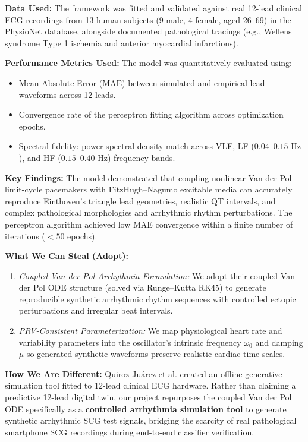 \textbf{Data Used:} The framework was fitted and validated against real 12-lead clinical ECG recordings from 13 human subjects (9 male, 4 female, aged 26--69) in the PhysioNet database, alongside documented pathological tracings (e.g., Wellens syndrome Type 1 ischemia and anterior myocardial infarctions).

\textbf{Performance Metrics Used:} The model was quantitatively evaluated using:
\begin{itemize}
    \item Mean Absolute Error ($\text{MAE}$) between simulated and empirical lead waveforms across 12 leads.
    \item Convergence rate of the perceptron fitting algorithm across optimization epochs.
    \item Spectral fidelity: power spectral density match across VLF, LF ($0.04\text{--}0.15\text{ Hz}$), and HF ($0.15\text{--}0.40\text{ Hz}$) frequency bands.
\end{itemize}

\textbf{Key Findings:} The model demonstrated that coupling nonlinear Van der Pol limit-cycle pacemakers with FitzHugh--Nagumo excitable media can accurately reproduce Einthoven's triangle lead geometries, realistic QT intervals, and complex pathological morphologies and arrhythmic rhythm perturbations. The perceptron algorithm achieved low MAE convergence within a finite number of iterations ($<50$ epochs).

\textbf{What We Can Steal (Adopt):}
\begin{enumerate}
    \item \textit{Coupled Van der Pol Arrhythmia Formulation:} We adopt their coupled Van der Pol ODE structure (solved via Runge--Kutta RK45) to generate reproducible synthetic arrhythmic rhythm sequences with controlled ectopic perturbations and irregular beat intervals.
    \item \textit{PRV-Consistent Parameterization:} We map physiological heart rate and variability parameters into the oscillator's intrinsic frequency $\omega_0$ and damping $\mu$ so generated synthetic waveforms preserve realistic cardiac time scales.
\end{enumerate}

\textbf{How We Are Different:} Quiroz-Ju{\'a}rez et al. created an offline generative simulation tool fitted to 12-lead clinical ECG hardware. Rather than claiming a predictive 12-lead digital twin, our project repurposes the coupled Van der Pol ODE specifically as a \textbf{controlled arrhythmia simulation tool} to generate synthetic arrhythmic SCG test signals, bridging the scarcity of real pathological smartphone SCG recordings during end-to-end classifier verification.

